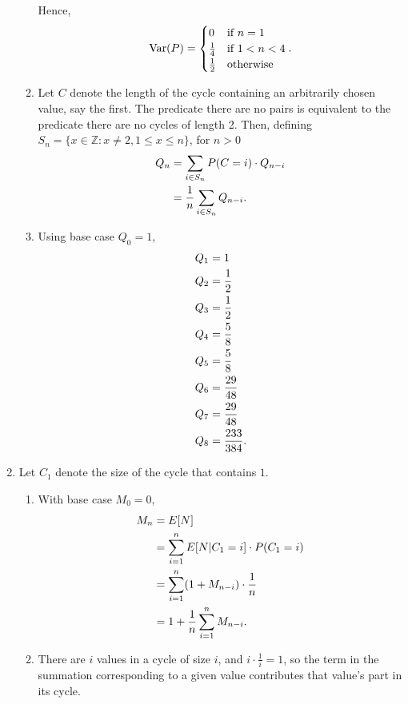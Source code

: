 \documentclass{article}
\DeclareMathOperator{\Var}{Var}
\begin{document}
\begin{enumerate}
\begin{enumerate}
        Hence,
        \[ \Var(P) =
                \begin{cases}
                    0 & \text{if } n=1 \\
                    \frac{1}{4} & \text{if } 1 < n < 4 \\
                    \frac{1}{2} & \text{otherwise}
                \end{cases} \text.
        \]
    \item
        Let $C$ denote the length of the cycle containing an arbitrarily chosen value, say the first.
        The predicate there are no pairs is equivalent to the predicate there are no cycles of length 2. Then,
        defining $S_n = \{ x \in \mathbb{Z} : x \neq 2, 1 \leq x \leq n \}$, for $n>0$
        \[\begin{split}
        Q_n & = \sum_{i \in S_n} P(C=i)\cdot Q_{n-i} \\
            & = \frac{1}{n} \sum_{i \in S_n} Q_{n-i} \text. \\
        \end{split}\]

    \item
        Using base case $Q_0=1$,
        \[\begin{split}
        Q_1 & = 1 \\
        Q_2 & = \frac{1}{2} \\
        Q_3 & = \frac{1}{2} \\
        Q_4 & = \frac{5}{8} \\
        Q_5 & = \frac{5}{8} \\
        Q_6 & = \frac{29}{48} \\
        Q_7 & = \frac{29}{48} \\
        Q_8 & = \frac{233}{384} \text.
        \end{split}\]
    \end{enumerate}
\item
    Let $C_1$ denote the size of the cycle that contains $1$.
    \begin{enumerate}
    \item
        With base case $M_0=0$,
        \[\begin{split}\label{eq:recurrenceM}
        M_n & = E[N] \\
            & = \sum_{i=1}^n E[N|C_1=i]\cdot P(C_1=i) \\
            & = \sum_{i=1}^n (1+M_{n-i})\cdot \frac{1}{n} \\
            & = 1 + \frac{1}{n}\sum_{i=1}^n M_{n-i} \text.
        \end{split}\]
    \item
        There are $i$ values in a cycle of size $i$, and $i\cdot\frac{1}{i}=1$, so the term in the summation corresponding
        to a given value contributes that value's part in its cycle.


\end{enumerate}
\end{enumerate}
\end{document}
